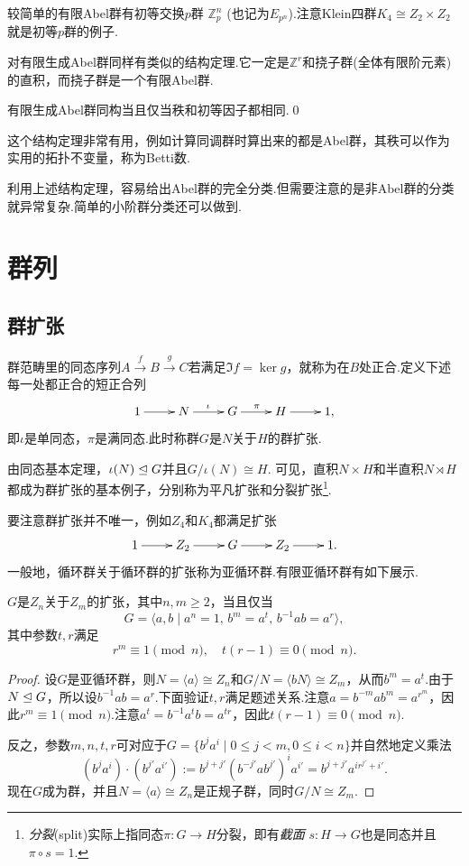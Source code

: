 较简单的有限Abel群有{\heiti 初等交换$p$群} $\mathbb{Z}_p^n$ (也记为$E_{p^n}$).注意Klein四群$K_4\cong Z_2\times Z_2$就是初等$p$群的例子.

对有限生成Abel群同样有类似的结构定理.它一定是$\mathbb{Z}^r$和{\heiti 挠子群}(全体有限阶元素)的直积，而挠子群是一个有限Abel群.

\begin{thm}[(有限生成Abel群结构)]
	有限生成Abel群同构当且仅当秩和初等因子都相同.\qed
\end{thm}
\begin{remark}
	这个结构定理非常有用，例如计算同调群时算出来的都是Abel群，其秩可以作为实用的拓扑不变量，称为Betti数.
\end{remark}

利用上述结构定理，容易给出Abel群的完全分类.但需要注意的是非Abel群的分类就异常复杂.简单的小阶群分类还可以做到.%


\section{群列}
\subsection{群扩张}\label{subsec:GroupExtension}
群范畴里的同态序列$A\overset{f}{\to} B\overset{g}{\to} C$若满足$\Im f=\ker g$，就称为在$B$处{\heiti 正合}.定义下述每一处都正合的{\heiti 短正合列}
\[
	\xymatrix{
		1\ar[r]&N\ar[r]^\iota&G\ar[r]^\pi&H\ar[r]&1,
	}
\]
即$\iota$是单同态，$\pi$是满同态.此时称群$G$是$N$关于$H$的{\heiti 群扩张}.

由同态基本定理，$\iota(N)\trianglelefteq G$并且$G/\iota(N)\cong H$.
可见，直积$N\times H$和半直积$N\rtimes H$都成为群扩张的基本例子，分别称为{\heiti 平凡扩张}和{\heiti 分裂扩张}\footnote{\emph{分裂}(split)实际上指同态$\pi\colon G\to H$分裂，即有\emph{截面} $s\colon H\to G$也是同态并且$\pi\circ s=1$.}.

要注意群扩张并不唯一，例如$Z_4$和$K_4$都满足扩张
\[
	\xymatrix{
		1\ar[r]&Z_2\ar[r]&G\ar[r]&Z_2\ar[r]&1.
	}
\]
一般地，循环群关于循环群的扩张称为{\heiti 亚循环群}.有限亚循环群有如下展示.
\begin{thm}[(H\"older)]
	$G$是$Z_n$关于$Z_m$的扩张，其中$n,m\ge 2$，当且仅当
	\[
		G=\langle a,b\mid a^n=1,\,b^m=a^t,\,b^{-1}ab=a^r\rangle ,
	\]
	其中参数$t,r$满足
	\[
		r^m\equiv 1\pmod{n},\quad t(r-1)\equiv 0\pmod{n}.
	\]
\end{thm}
\begin{proof}
	设$G$是亚循环群，则$N=\langle a\rangle\cong Z_n$和$G/N=\langle bN\rangle \cong Z_m$，从而$b^m=a^t$.由于$N\trianglelefteq G$，所以设$b^{-1}ab=a^r$.下面验证$t,r$满足题述关系.注意$a=b^{-m}ab^m=a^{r^m}$，因此$r^m\equiv 1\pmod n$.注意$a^t=b^{-1}a^tb=a^{tr}$，因此$t(r-1)\equiv 0\pmod n$.

	反之，参数$m,n,t,r$可对应于$G=\{b^ja^i\mid 0\le j<m,0\le i<n\}$并自然地定义乘法
	\[
		(b^ja^i)\cdot (b^{j'}a^{i'}):=b^{j+j'}(b^{-j'}ab^{j'})^ia^{i'}=b^{j+j'}a^{ir^{j'}+i'}.
	\]
	现在$G$成为群，并且$N=\langle a\rangle\cong Z_n$是正规子群，同时$G/N\cong Z_m$.
\end{proof}

